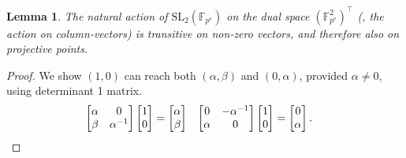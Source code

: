 \documentclass{toc}
\numberwithin{equation}{section}
\theoremstyle{plain}       %
\newtheorem{lem}[equation]{Lemma}
\theoremstyle{remark}
\theoremstyle{definition}
\numberwithin{figure}{section}
\numberwithin{table}{section}
\newcommand{\bbF}{\mathbb{F}}  %
\begin{document}
\begin{lem}\label{lem:first-trans}
	The natural action of $\mathrm{SL}_2(\bbF_{p^e})$ on the dual space
	$(\bbF_{p^e}^{2})^{\top}$ (\ie, the action on column-vectors) is transitive
	on non-zero vectors, and therefore also on projective points.
\end{lem}
\begin{proof}
	We show $(1,0)$ can reach both $(\alpha,\beta)$ and $(0,\alpha)$, provided
	$\alpha\neq 0$, using determinant 1 matrix.
	\begin{align*}
	\begin{bmatrix} \alpha & 0 \\ \beta & \alpha^{-1} \end{bmatrix}
	\begin{bmatrix} 1\\ 0 \end{bmatrix}
	& = \begin{bmatrix}\alpha\\ \beta\end{bmatrix} &
	\begin{bmatrix} 0 & -\alpha^{-1} \\ \alpha & 0 \end{bmatrix}
	\begin{bmatrix} 1\\ 0 \end{bmatrix}
	& = \begin{bmatrix} 0 \\ \alpha\end{bmatrix}. \qedhere
	\end{align*}
\end{proof}
\end{document}
